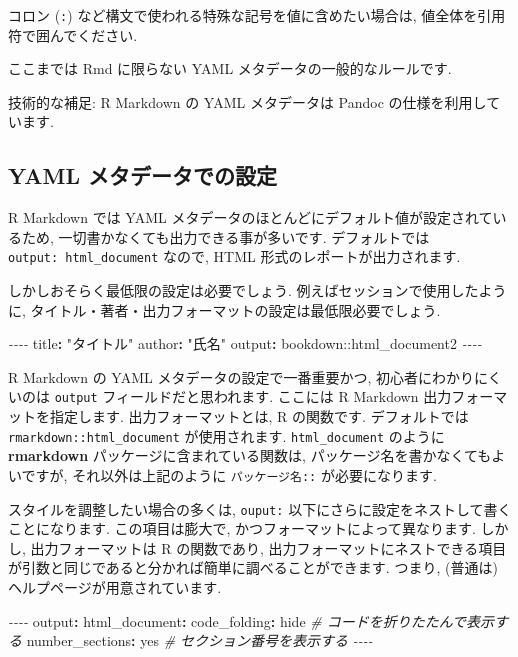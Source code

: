 \documentclass[
]{ltjsarticle}
\newenvironment{Shaded}{\begin{snugshade}}{\end{snugshade}}
\newcommand{\AttributeTok}[1]{\textcolor[rgb]{0.77,0.63,0.00}{#1}}
\newcommand{\CharTok}[1]{\textcolor[rgb]{0.31,0.60,0.02}{#1}}
\newcommand{\CommentTok}[1]{\textcolor[rgb]{0.56,0.35,0.01}{\textit{#1}}}
\newcommand{\FunctionTok}[1]{\textcolor[rgb]{0.00,0.00,0.00}{#1}}
\newcommand{\KeywordTok}[1]{\textcolor[rgb]{0.13,0.29,0.53}{\textbf{#1}}}
\newcommand{\PreprocessorTok}[1]{\textcolor[rgb]{0.56,0.35,0.01}{\textit{#1}}}
\newcommand{\StringTok}[1]{\textcolor[rgb]{0.31,0.60,0.02}{#1}}
\begin{document}
コロン (\texttt{:}) など構文で使われる特殊な記号を値に含めたい場合は, 値全体を引用符で囲んでください.

ここまでは Rmd に限らない YAML メタデータの一般的なルールです.

技術的な補足: R Markdown の YAML メタデータは Pandoc の仕様を利用しています.

\hypertarget{yaml-ux30e1ux30bfux30c7ux30fcux30bfux3067ux306eux8a2dux5b9a}{%
\subsection{YAML メタデータでの設定}\label{yaml-ux30e1ux30bfux30c7ux30fcux30bfux3067ux306eux8a2dux5b9a}}

R Markdown では YAML メタデータのほとんどにデフォルト値が設定されているため, 一切書かなくても出力できる事が多いです. デフォルトでは \texttt{output:\ html\_document} なので, HTML 形式のレポートが出力されます.

しかしおそらく最低限の設定は必要でしょう. 例えばセッションで使用したように, タイトル・著者・出力フォーマットの設定は最低限必要でしょう.

\begin{Shaded}
\begin{Highlighting}[]
\PreprocessorTok{{-}{-}{-}{-}}
\FunctionTok{title}\KeywordTok{:}\AttributeTok{ }\StringTok{"タイトル"}
\FunctionTok{author}\KeywordTok{:}\AttributeTok{ }\StringTok{"氏名"}
\FunctionTok{output}\KeywordTok{:}\AttributeTok{ bookdown::html\_document2}
\PreprocessorTok{{-}{-}{-}{-}}
\end{Highlighting}
\end{Shaded}

R Markdown の YAML メタデータの設定で一番重要かつ, 初心者にわかりにくいのは \texttt{output} フィールドだと思われます. ここには R Markdown 出力フォーマットを指定します. 出力フォーマットとは, R の関数です. デフォルトでは \texttt{rmarkdown::html\_document} が使用されます. \texttt{html\_document} のように \textbf{rmarkdown} パッケージに含まれている関数は, パッケージ名を書かなくてもよいですが, それ以外は上記のように \texttt{パッケージ名::} が必要になります.

スタイルを調整したい場合の多くは, \texttt{ouput:} 以下にさらに設定をネストして書くことになります. この項目は膨大で, かつフォーマットによって異なります. しかし, 出力フォーマットは R の関数であり, 出力フォーマットにネストできる項目が引数と同じであると分かれば簡単に調べることができます. つまり, (普通は) ヘルプページが用意されています.

\begin{Shaded}
\begin{Highlighting}[]
\PreprocessorTok{{-}{-}{-}{-}}
\FunctionTok{output}\KeywordTok{:}
\AttributeTok{  }\FunctionTok{html\_document}\KeywordTok{:}
\AttributeTok{    }\FunctionTok{code\_folding}\KeywordTok{:}\AttributeTok{ hide}\CommentTok{  \# コードを折りたたんで表示する}
\AttributeTok{    }\FunctionTok{number\_sections}\KeywordTok{:}\AttributeTok{ }\CharTok{yes}\CommentTok{  \# セクション番号を表示する}
\PreprocessorTok{{-}{-}{-}{-}}
\end{Highlighting}
\end{Shaded}
\end{document}
